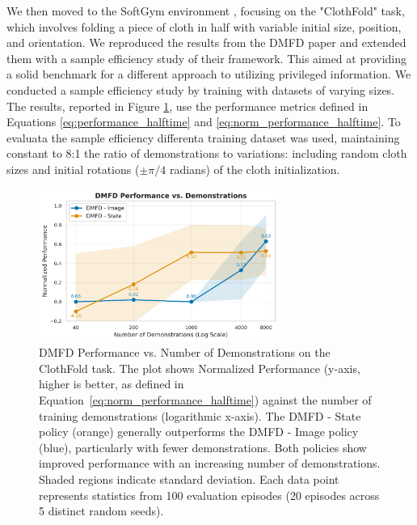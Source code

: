 \documentclass{article}
\begin{document}
 We then moved to the SoftGym environment \cite{lin2021softgym}, focusing on the "ClothFold" task, which involves folding a piece of cloth in half with variable initial size, position, and orientation. We reproduced the results from the DMFD paper \cite{salhotra2022learning} and extended them with a sample efficiency study of their framework. This aimed at providing a solid benchmark for a different approach to utilizing privileged information. We conducted a sample efficiency study by training with datasets of varying sizes. The results, reported in Figure \ref{fig:dmfd_clothfold_efficiency}, use the performance metrics defined in Equations \eqref{eq:performance_halftime} and \eqref{eq:norm_performance_halftime}.
To evaluata the sample efficiency differenta training dataset was used, maintaining constant to 8:1 the ratio of demonstrations to variations: including random cloth sizes and initial rotations (\(\pm\pi/4\) radians) of the cloth initialization. 

\begin{figure}[htbp]
    \centering
    \includegraphics[width=0.7\textwidth]{./media/dmfd-efficiency.png}
    \caption{DMFD Performance vs. Number of Demonstrations on the ClothFold task. The plot shows Normalized Performance (y-axis, higher is better, as defined in Equation~\eqref{eq:norm_performance_halftime}) against the number of training demonstrations (logarithmic x-axis). The DMFD - State policy (orange) generally outperforms the DMFD - Image policy (blue), particularly with fewer demonstrations. Both policies show improved performance with an increasing number of demonstrations. Shaded regions indicate standard deviation. Each data point represents statistics from 100 evaluation episodes (20 episodes across 5 distinct random seeds).}
    \label{fig:dmfd_clothfold_efficiency}
\end{figure}
\end{document}
